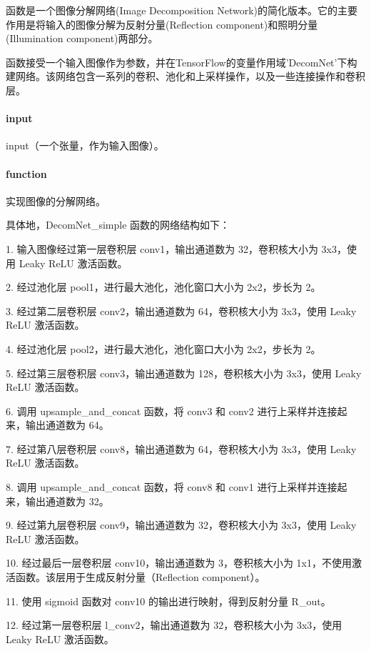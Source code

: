 \documentclass[letterpaper,12pt]{article}
\begin{document}
		函数是一个图像分解网络(Image Decomposition Network)的简化版本。它的主要作用是将输入的图像分解为反射分量(Reflection component)和照明分量(Illumination component)两部分。
		
		函数接受一个输入图像作为参数，并在TensorFlow的变量作用域'DecomNet'下构建网络。该网络包含一系列的卷积、池化和上采样操作，以及一些连接操作和卷积层。
	
		\paragraph{input}
		
		input（一个张量，作为输入图像）。
		
		\paragraph{function}
		
		实现图像的分解网络。
		
		具体地，DecomNet\_simple 函数的网络结构如下：
		
		1. 输入图像经过第一层卷积层 conv1，输出通道数为 32，卷积核大小为 3x3，使用 Leaky ReLU 激活函数。
		
		2. 经过池化层 pool1，进行最大池化，池化窗口大小为 2x2，步长为 2。
		
		3. 经过第二层卷积层 conv2，输出通道数为 64，卷积核大小为 3x3，使用 Leaky ReLU 激活函数。
		
		4. 经过池化层 pool2，进行最大池化，池化窗口大小为 2x2，步长为 2。
		
		5. 经过第三层卷积层 conv3，输出通道数为 128，卷积核大小为 3x3，使用 Leaky ReLU 激活函数。
		
		6. 调用 upsample\_and\_concat 函数，将 conv3 和 conv2 进行上采样并连接起来，输出通道数为 64。
		
		7. 经过第八层卷积层 conv8，输出通道数为 64，卷积核大小为 3x3，使用 Leaky ReLU 激活函数。
		
		8. 调用 upsample\_and\_concat 函数，将 conv8 和 conv1 进行上采样并连接起来，输出通道数为 32。
		
		9. 经过第九层卷积层 conv9，输出通道数为 32，卷积核大小为 3x3，使用 Leaky ReLU 激活函数。
		
		10. 经过最后一层卷积层 conv10，输出通道数为 3，卷积核大小为 1x1，不使用激活函数。该层用于生成反射分量（Reflection component）。
		
		11. 使用 sigmoid 函数对 conv10 的输出进行映射，得到反射分量 R\_out。
		
		12. 经过第一层卷积层 l\_conv2，输出通道数为 32，卷积核大小为 3x3，使用 Leaky ReLU 激活函数。
		
\end{document}
